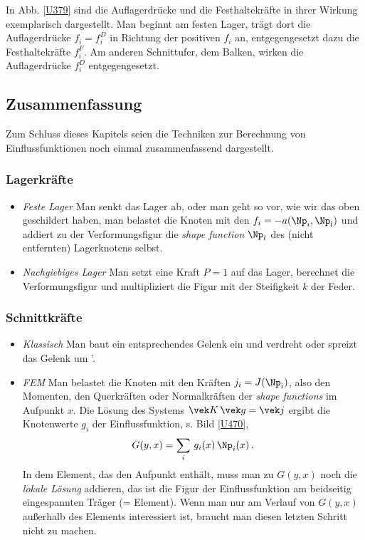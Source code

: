 {{In Abb. \ref{U379} sind die Auflagerdr\"{u}cke und die Festhaltekr\"{a}fte in ihrer Wirkung exemplarisch dargestellt. Man beginnt am festen Lager, tr\"{a}gt dort die Auflagerdr\"{u}cke $f_i = f_i^D$ in Richtung der positiven $f_i$ an, entgegengesetzt dazu die Festhaltekr\"{a}fte $f_i^F$. Am anderen Schnittufer, dem Balken, wirken die Auflagerdr\"{u}cke $f_i^D$ entgegengesetzt.

{\textcolor{blau2}{\section{Zusammenfassung}}
Zum Schluss dieses Kapitels seien die Techniken zur Berechnung von Einflussfunktionen  noch einmal zusammenfassend dargestellt.

{\textcolor{blau2}{\subsubsection*{Lagerkr\"{a}fte}}

\begin{itemize}
  \item {\em Feste Lager\/} Man senkt das Lager ab, oder man geht so vor, wie wir das oben geschildert haben, man belastet die Knoten mit den $f_i = -a(\Np_i,\Np_l)$ und addiert zu der Verformungsfigur die {\em shape function\/} $\Np_l$ des (nicht entfernten) Lagerknotens selbst.
  \item {\em Nachgiebiges Lager\/} Man setzt eine Kraft $P = 1$ auf das Lager, berechnet die Verformungsfigur und multipliziert die Figur mit der Steifigkeit $k$ der Feder.
  \end{itemize}
\vspace{-1.0cm}
{\textcolor{blau2}{\subsubsection*{Schnittkr\"{a}fte}}
\begin{itemize}
  \item {\em Klassisch} Man baut ein entsprechendes Gelenk ein und verdreht oder spreizt das Gelenk um '.
      \item {\em FEM\/} Man belastet die Knoten mit den Kr\"{a}ften $j_i = J(\Np_i)$, also den Momenten, den Querkr\"{a}ften oder Normalkr\"{a}ften der {\em shape functions\/} im Aufpunkt $x$. Die L\"{o}sung des Systems $\vek K\,\vek g = \vek j$ ergibt die Knotenwerte $g_i$ der Einflussfunktion, s. Bild \ref{U470},
          \begin{align}
          G(y,x) = \sum_i\,g_i(x)\,\Np_i(x)\,.
          \end{align}
 In dem Element, das den Aufpunkt enth\"{a}lt, muss man zu $G(y,x)$ noch die {\em lokale L\"{o}sung\/} addieren, das ist die Figur der Einflussfunktion am beidseitig eingespannten Tr\"{a}ger (= Element). Wenn man nur am Verlauf von $G(y,x)$ au{\ss}erhalb des Elements interessiert ist, braucht man diesen letzten Schritt nicht zu machen.
\end{itemize}

}}}}}
